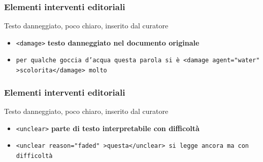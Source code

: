 \begin{frame}
    \frametitle{Elementi interventi editoriali}
    \addtocounter{nframe}{1}
    

    \begin{block}{Testo danneggiato, poco chiaro, inserito dal curatore}
        \begin{itemize}
            \item \texttt{<damage>} \textbf{testo danneggiato nel documento originale}
            \item[] \texttt{per qualche goccia d’acqua questa parola si è <damage agent="water" >scolorita</damage> molto}
        \end{itemize}
        
    \end{block}
    
\end{frame}

\begin{frame}
    \frametitle{Elementi interventi editoriali}
    \addtocounter{nframe}{1}
    

    \begin{block}{Testo danneggiato, poco chiaro, inserito dal curatore}
        \begin{itemize}
            \item \texttt{<unclear>} \textbf{parte di testo interpretabile con difficoltà}
            \item[] \texttt{<unclear reason="faded" >questa</unclear> si legge
            ancora ma con difficoltà}
        \end{itemize}
        
    \end{block}
    
\end{frame}

